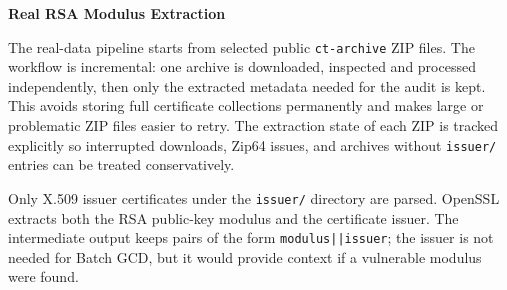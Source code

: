 \documentclass{article}
\newlength{\postercolwidth}
\newenvironment{posterfigure}
{
  \vspace{0.24cm}
  \begin{center}
}
{
  \end{center}
  \vspace{0.16cm}
}
\newenvironment{posterblock}[1]
{
  \vspace{1.0cm}
  \noindent
  \begin{minipage}{\postercolwidth}
  \colorbox{posterblue}{%
    \parbox{\dimexpr\postercolwidth-2\fboxsep\relax}{%
      \color{white}\bfseries\fontsize{32}{38}\selectfont #1
    }%
  }
  \par\vspace{0.22cm}
  \color{postergray}
  \fontsize{29}{35}\selectfont
}
{
  \end{minipage}
  \par
}
\begin{document}
\begin{minipage}[t]{\postercolwidth}

\begin{posterblock}{Real RSA Modulus Extraction}
The real-data pipeline starts from selected public \texttt{ct-archive} ZIP
files. The workflow is incremental: one archive is downloaded, inspected and
processed independently, then only the extracted metadata needed for the audit
is kept. This avoids storing full certificate collections permanently and makes
large or problematic ZIP files easier to retry. The extraction state of each
ZIP is tracked explicitly so interrupted downloads, Zip64 issues, and archives
without \texttt{issuer/} entries can be treated conservatively.

Only X.509 issuer certificates under the \texttt{issuer/} directory are parsed.
OpenSSL extracts both the RSA public-key modulus and the certificate issuer.
The intermediate output keeps pairs of the form \texttt{modulus||issuer}; the
issuer is not needed for Batch GCD, but it would provide context if a vulnerable
modulus were found.

\begin{posterfigure}
\end{posterfigure}


\end{posterblock}
\end{minipage}
\end{document}
